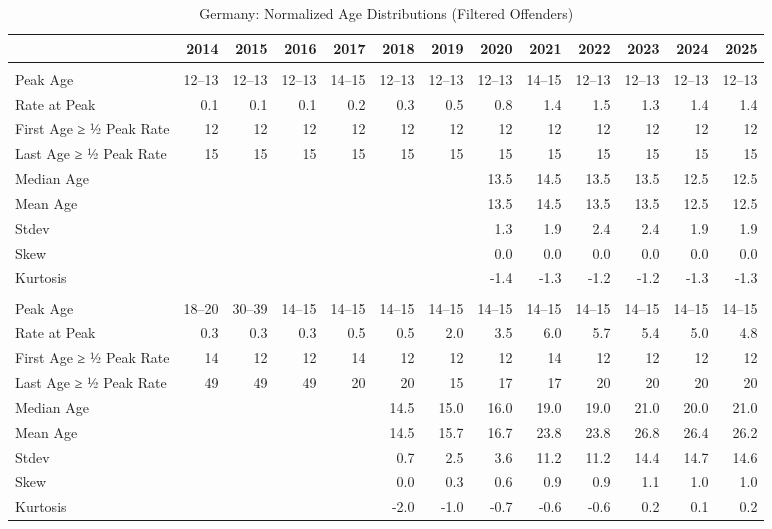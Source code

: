 \begin{table}[!t]
\caption*{
{\large Germany: Normalized Age Distributions (Filtered Offenders)}
} 

\fontsize{12.0pt}{14.4pt}\selectfont

\begin{tabular*}{\linewidth}{@{\extracolsep{\fill}}l|rrrrrrrrrrrr}
\toprule
  & 2014 & 2015 & 2016 & 2017 & 2018 & 2019 & 2020 & 2021 & 2022 & 2023 & 2024 & 2025 \\ 
\midrule\addlinespace[2.5pt]
\multicolumn{13}{l}{Female} \\[2.5pt] 
\midrule\addlinespace[2.5pt]
Peak Age & 12–13 & 12–13 & 12–13 & 14–15 & 12–13 & 12–13 & 12–13 & 14–15 & 12–13 & 12–13 & 12–13 & 12–13 \\
Rate at Peak & 0.1 & 0.1 & 0.1 & 0.2 & 0.3 & 0.5 & 0.8 & 1.4 & 1.5 & 1.3 & 1.4 & 1.4 \\
First Age ≥ ½ Peak Rate & 12 & 12 & 12 & 12 & 12 & 12 & 12 & 12 & 12 & 12 & 12 & 12 \\
Last Age ≥ ½ Peak Rate & 15 & 15 & 15 & 15 & 15 & 15 & 15 & 15 & 15 & 15 & 15 & 15 \\
Median Age &  &  &  &  &  &  & 13.5 & 14.5 & 13.5 & 13.5 & 12.5 & 12.5 \\
Mean Age &  &  &  &  &  &  & 13.5 & 14.5 & 13.5 & 13.5 & 12.5 & 12.5 \\
Stdev &  &  &  &  &  &  & 1.3 & 1.9 & 2.4 & 2.4 & 1.9 & 1.9 \\
Skew &  &  &  &  &  &  & 0.0 & 0.0 & 0.0 & 0.0 & 0.0 & 0.0 \\
Kurtosis &  &  &  &  &  &  & -1.4 & -1.3 & -1.2 & -1.2 & -1.3 & -1.3 \\
\midrule\addlinespace[2.5pt]
\multicolumn{13}{l}{Male} \\[2.5pt] 
\midrule\addlinespace[2.5pt]
Peak Age & 18–20 & 30–39 & 14–15 & 14–15 & 14–15 & 14–15 & 14–15 & 14–15 & 14–15 & 14–15 & 14–15 & 14–15 \\
Rate at Peak & 0.3 & 0.3 & 0.3 & 0.5 & 0.5 & 2.0 & 3.5 & 6.0 & 5.7 & 5.4 & 5.0 & 4.8 \\
First Age ≥ ½ Peak Rate & 14 & 12 & 12 & 14 & 12 & 12 & 12 & 14 & 12 & 12 & 12 & 12 \\
Last Age ≥ ½ Peak Rate & 49 & 49 & 49 & 20 & 20 & 15 & 17 & 17 & 20 & 20 & 20 & 20 \\
Median Age &  &  &  &  & 14.5 & 15.0 & 16.0 & 19.0 & 19.0 & 21.0 & 20.0 & 21.0 \\
Mean Age &  &  &  &  & 14.5 & 15.7 & 16.7 & 23.8 & 23.8 & 26.8 & 26.4 & 26.2 \\
Stdev &  &  &  &  & 0.7 & 2.5 & 3.6 & 11.2 & 11.2 & 14.4 & 14.7 & 14.6 \\
Skew &  &  &  &  & 0.0 & 0.3 & 0.6 & 0.9 & 0.9 & 1.1 & 1.0 & 1.0 \\
Kurtosis &  &  &  &  & -2.0 & -1.0 & -0.7 & -0.6 & -0.6 & 0.2 & 0.1 & 0.2 \\
\bottomrule
\end{tabular*}

\end{table}
